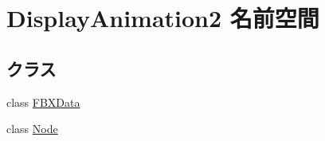 \hypertarget{namespace_display_animation2}{}\section{Display\+Animation2 名前空間}
\label{namespace_display_animation2}
\subsection*{クラス}
\begin{DoxyCompactItemize}
\item 
class \hyperlink{class_display_animation2_1_1_f_b_x_data}{F\+B\+X\+Data}
\item 
class \hyperlink{class_display_animation2_1_1_node}{Node}
\end{DoxyCompactItemize}
